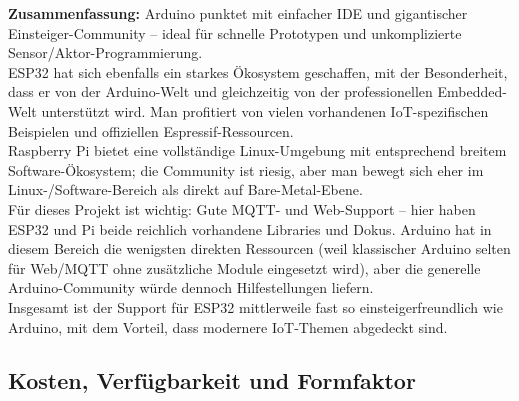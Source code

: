 \vspace{5mm}

\noindent\textbf{Zusammenfassung:} Arduino punktet mit einfacher IDE und gigantischer Einsteiger-Community – ideal für schnelle Prototypen und unkomplizierte Sen\-sor/Ak\-tor-Pro\-gram\-mier\-ung. 
\\
ESP32 hat sich ebenfalls ein starkes Ökosystem geschaffen, mit der Besonderheit, dass er von der Arduino-Welt und gleichzeitig von der professionellen Embedded-Welt unterstützt wird. Man profitiert von vielen vorhandenen IoT-spezifischen Beispielen und offiziellen Espressif-Ressourcen. 
\\ 
Raspberry Pi bietet eine vollständige Linux-Umgebung mit entsprechend breitem Software-Ökosystem; die Community ist riesig, aber man bewegt sich eher im Linux-/Software-Bereich als direkt auf Bare-Metal-Ebene. 
\\Für dieses Projekt ist wichtig: Gute MQTT- und Web-Support – hier haben ESP32 und Pi beide reichlich vorhandene Libraries und Dokus. Arduino hat in diesem Bereich die wenigsten direkten Ressourcen (weil klassischer Arduino selten für Web/MQTT ohne zusätzliche Module eingesetzt wird), aber die generelle Arduino-Community würde dennoch Hilfestellungen liefern. 
\\
Insgesamt ist der Support für ESP32 mittlerweile fast so einsteigerfreundlich wie Arduino, mit dem Vorteil, dass modernere IoT-Themen abgedeckt sind.

\subsection{Kosten, Verfügbarkeit und Formfaktor}

